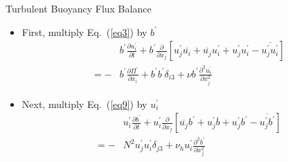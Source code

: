 \begin{frame}{Turbulent Buoyancy Flux Balance}
\begin{itemize}
  	\item First, multiply Eq.~(\ref{eq3}) by $b^\prime$
  	\small
  	\begin{align}
  	\label{eq10}
  	& b^\prime\frac{\partial u_i^\prime}{\partial t} + b^\prime\frac{\partial}{\partial x_j}\left[u_j^\prime \overline{u_i} + \overline{u_j} u_i^\prime + u_j^\prime  u_i^\prime - \overline{u_j^\prime u_i^\prime}\right]\\ 
  	= - & b^\prime\frac{\partial \Pi^\prime}{\partial x_i} +b^\prime b^\prime\delta_{i3} + \nu b^\prime \frac{\partial^2 u_i^\prime}{\partial x_j^2}\nonumber	
  	\end{align}
  	\item Next, multiply Eq.~(\ref{eq9}) by $u_i^\prime$
  	\begin{align}
  	\label{eq11}
  	& u_i^\prime\frac{\partial b^\prime}{\partial t} + u_i^\prime\frac{\partial}{\partial x_j}\left[\overline{u_j}b^\prime + u_j^\prime \overline{b} + u_j^\prime b^\prime - \overline{u_j^\prime b^\prime}\right]\\ = -&N^2 u_j^\prime u_i^\prime \delta_{j3} + \nu_h u_i^\prime \frac{\partial^2 b^\prime}{\partial x_j^2}\nonumber
  	\end{align}
  \end{itemize}
\end{frame}
